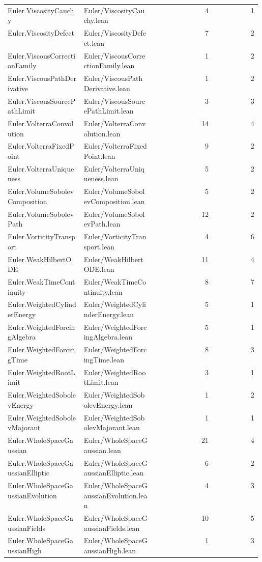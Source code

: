 \begin{longtable}{p{0.30\linewidth}p{0.28\linewidth}rr}
Euler.ViscosityCauchy & Euler/ViscosityCauchy.lean & 4 & 1\\
Euler.ViscosityDefect & Euler/ViscosityDefect.lean & 7 & 2\\
Euler.ViscousCorrectionFamily & Euler/ViscousCorrectionFamily.lean & 1 & 2\\
Euler.ViscousPathDerivative & Euler/ViscousPathDerivative.lean & 1 & 2\\
Euler.ViscousSourcePathLimit & Euler/ViscousSourcePathLimit.lean & 3 & 3\\
Euler.VolterraConvolution & Euler/VolterraConvolution.lean & 14 & 4\\
Euler.VolterraFixedPoint & Euler/VolterraFixedPoint.lean & 9 & 2\\
Euler.VolterraUniqueness & Euler/VolterraUniqueness.lean & 5 & 2\\
Euler.VolumeSobolevComposition & Euler/VolumeSobolevComposition.lean & 5 & 2\\
Euler.VolumeSobolevPath & Euler/VolumeSobolevPath.lean & 12 & 2\\
Euler.VorticityTransport & Euler/VorticityTransport.lean & 4 & 6\\
Euler.WeakHilbertODE & Euler/WeakHilbertODE.lean & 11 & 4\\
Euler.WeakTimeContinuity & Euler/WeakTimeContinuity.lean & 8 & 7\\
Euler.WeightedCylinderEnergy & Euler/WeightedCylinderEnergy.lean & 5 & 1\\
Euler.WeightedForcingAlgebra & Euler/WeightedForcingAlgebra.lean & 5 & 1\\
Euler.WeightedForcingTime & Euler/WeightedForcingTime.lean & 8 & 3\\
Euler.WeightedRootLimit & Euler/WeightedRootLimit.lean & 3 & 1\\
Euler.WeightedSobolevEnergy & Euler/WeightedSobolevEnergy.lean & 1 & 2\\
Euler.WeightedSobolevMajorant & Euler/WeightedSobolevMajorant.lean & 1 & 1\\
Euler.WholeSpaceGaussian & Euler/WholeSpaceGaussian.lean & 21 & 4\\
Euler.WholeSpaceGaussianElliptic & Euler/WholeSpaceGaussianElliptic.lean & 6 & 2\\
Euler.WholeSpaceGaussianEvolution & Euler/WholeSpaceGaussianEvolution.lean & 4 & 3\\
Euler.WholeSpaceGaussianFields & Euler/WholeSpaceGaussianFields.lean & 10 & 5\\
Euler.WholeSpaceGaussianHigh & Euler/WholeSpaceGaussianHigh.lean & 1 & 3\\

\end{longtable}
